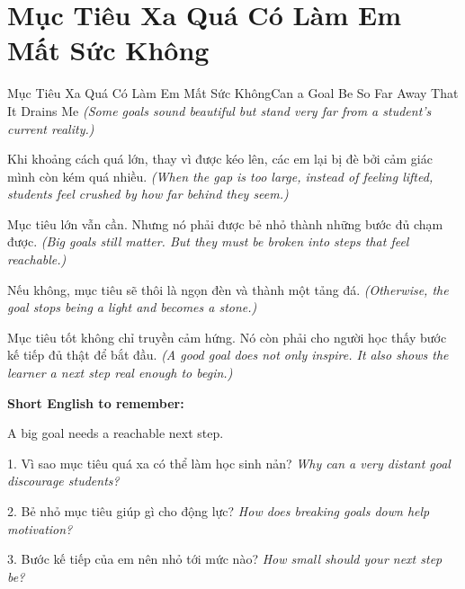 \section{Mục Tiêu Xa Quá Có Làm Em Mất Sức Không}
\begin{truyen}{Mục Tiêu Xa Quá Có Làm Em Mất Sức Không}{Can a Goal Be So Far Away That It Drains Me}
\textit{(Some goals sound beautiful but stand very far from a student's current reality.)}

Khi khoảng cách quá lớn, thay vì được kéo lên, các em lại bị đè bởi cảm giác mình còn kém quá nhiều.
\textit{(When the gap is too large, instead of feeling lifted, students feel crushed by how far behind they seem.)}

Mục tiêu lớn vẫn cần. Nhưng nó phải được bẻ nhỏ thành những bước đủ chạm được.
\textit{(Big goals still matter. But they must be broken into steps that feel reachable.)}

Nếu không, mục tiêu sẽ thôi là ngọn đèn và thành một tảng đá.
\textit{(Otherwise, the goal stops being a light and becomes a stone.)}
\end{truyen}

\begin{baihoc}
Mục tiêu tốt không chỉ truyền cảm hứng. Nó còn phải cho người học thấy bước kế tiếp đủ thật để bắt đầu.
\textit{(A good goal does not only inspire. It also shows the learner a next step real enough to begin.)}
\end{baihoc}

\begin{ghinhoanh}
\textbf{Short English to remember:}

A big goal needs a reachable next step.

\end{ghinhoanh}

\begin{tuhocnhanh}
1. Vì sao mục tiêu quá xa có thể làm học sinh nản? \textit{Why can a very distant goal discourage students?}

2. Bẻ nhỏ mục tiêu giúp gì cho động lực? \textit{How does breaking goals down help motivation?}

3. Bước kế tiếp của em nên nhỏ tới mức nào? \textit{How small should your next step be?}
\end{tuhocnhanh}
\ngancach

